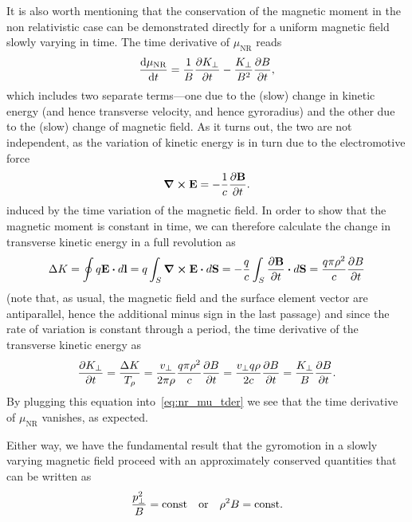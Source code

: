 It is also worth mentioning that the conservation of the magnetic moment in the
non relativistic case can be demonstrated directly for a uniform magnetic field
slowly varying in time. The time derivative of $\mu_\text{NR}$ reads
\begin{align}\label{eq:nr_mu_tder}
  \dv{\mu_\text{NR}}{t} =
  \frac{1}{B}\pdv{\ensuremath{K}_\perp}{t} - \frac{K_\perp}{B^2}\pdv{B}{t},
\end{align}
which includes two separate terms---one due to the (slow) change in kinetic energy
(and hence transverse velocity, and hence gyroradius) and the other due to the (slow)
change of magnetic field. As it turns out, the two are not independent, as the variation
of kinetic energy is in turn due to the electromotive force
\begin{align*}
  \curl\vb{E} = -\frac{1}{c}\pdv{\vb{B}}{t}.
\end{align*}
induced by the time variation of the magnetic field. In order to show that the
magnetic moment is constant in time, we can therefore calculate the change in
transverse kinetic energy in a full revolution as
\begin{align*}
  \Delta \kine = \oint q\vb{E} \dotproduct d\vb{l} =
  q \int_S \curl \vb{E} \dotproduct d\vb{S} =
  - \frac{q}{c} \int_S\pdv{\vb{B}}{t} \dotproduct d\vb{S} =
  \frac{q\pi \gyrorad^2}{c} \pdv{B}{t}
\end{align*}
(note that, as usual, the magnetic field and the surface element vector are antiparallel,
hence the additional minus sign in the last passage) and since the rate of variation
is constant through a period, the time derivative of the transverse kinetic energy as
\begin{align*}
  \pdv{\ensuremath{K}_\perp}{t} = \frac{\Delta K}{T_{\rho}} =
  \frac{v_\perp}{2\pi\rho} \frac{q\pi \rho^2}{c} \pdv{B}{t} =
  \frac{v_\perp q \rho}{2c}\pdv{B}{t} = \frac{K_\perp}{B}\pdv{B}{t}.
\end{align*}
By plugging this equation into~\eqref{eq:nr_mu_tder} we see that the time derivative
of $\mu_\text{NR}$ vanishes, as expected.

Either way, we have the fundamental result that the gyromotion in a slowly varying
magnetic field proceed with an approximately conserved quantities that can
be written as
\begin{align}
  \frac{p_\perp^2}{B} = \text{const}
  \quad\text{or}\quad
  \rho^2 B = \text{const}.
\end{align}

